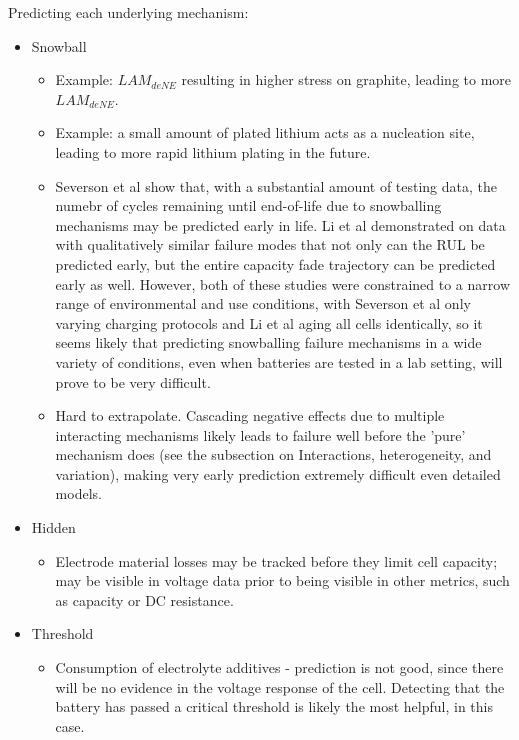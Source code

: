 \documentclass[journal=jpclcd,manuscript=article]{achemso}
\begin{document}
Predicting each underlying mechanism:
\begin{itemize}
    \item Snowball
    \begin{itemize}
        \item Example: $LAM_{deNE}$ resulting in higher stress on graphite, leading to more $LAM_{deNE}$.
        \item Example: a small amount of plated lithium acts as a nucleation site, leading to more rapid lithium plating in the future.
        \item Severson et al \cite{severson_data-driven_2019} show that, with a substantial amount of testing data, the numebr of cycles remaining until end-of-life due to snowballing mechanisms may be predicted early in life. Li et al \cite{li_one_shot_2021} demonstrated on data with qualitatively similar failure modes that not only can the RUL be predicted early, but the entire capacity fade trajectory can be predicted early as well. However, both of these studies were constrained to a narrow range of environmental and use conditions, with Severson et al \cite{severson_data-driven_2019} only varying charging protocols and Li et al \cite{li_one_shot_2021} aging all cells identically, so it seems likely that predicting snowballing failure mechanisms in a wide variety of conditions, even when batteries are tested in a lab setting, will prove to be very difficult.
        \item Hard to extrapolate. Cascading negative effects due to multiple interacting mechanisms likely leads to failure well before the 'pure' mechanism does (see the subsection on Interactions, heterogeneity, and variation), making very early prediction extremely difficult even detailed models.
    \end{itemize}
    \item Hidden
    \begin{itemize}
        \item Electrode material losses may be tracked before they limit cell capacity; may be visible in voltage data prior to being visible in other metrics, such as capacity or DC resistance.
    \end{itemize}
    \item Threshold
    \begin{itemize}
        \item Consumption of electrolyte additives - prediction is not good, since there will be no evidence in the voltage response of the cell. Detecting that the battery has passed a critical threshold is likely the most helpful, in this case.
    \end{itemize}
\end{itemize}
\end{document}
